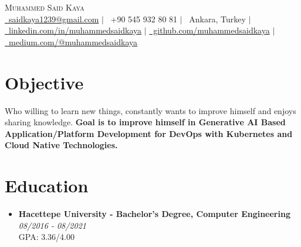 \documentclass[a4paper,10pt]{article}
\begin{document}
\begin{center}
    {\Huge \scshape Muhammed Said Kaya} \\[1em]
    \href{mailto:saidkaya1239@gmail.com}{\faEnvelope \ saidkaya1239@gmail.com} $|$ 
    \faPhone \ +90 545 932 80 81 $|$
    \faMapMarker \ Ankara, Turkey $|$ 
    \href{https://linkedin.com/in/muhammedsaidkaya}{\faLinkedinSquare \ linkedin.com/in/muhammedsaidkaya} $|$ 
    \href{https://github.com/muhammedsaidkaya}{\faGithub \ github.com/muhammedsaidkaya} $|$ 
    \href{https://medium.com/@muhammedsaidkaya}{\faMedium \ medium.com/@muhammedsaidkaya}
\end{center}

\vspace{0.5em}

\section*{Objective}
Who willing to learn new things, constantly wants to improve himself and enjoys sharing knowledge. \textbf{Goal is to improve himself in Generative AI Based Application/Platform Development for DevOps with Kubernetes and Cloud Native Technologies.}

\section*{Education}
\begin{itemize}[leftmargin=0.5cm]
    \item \textbf{Hacettepe University - Bachelor's Degree, Computer Engineering} \hfill \textit{08/2016 - 08/2021} \\
    GPA: 3.36/4.00
\end{itemize}
\end{document}
